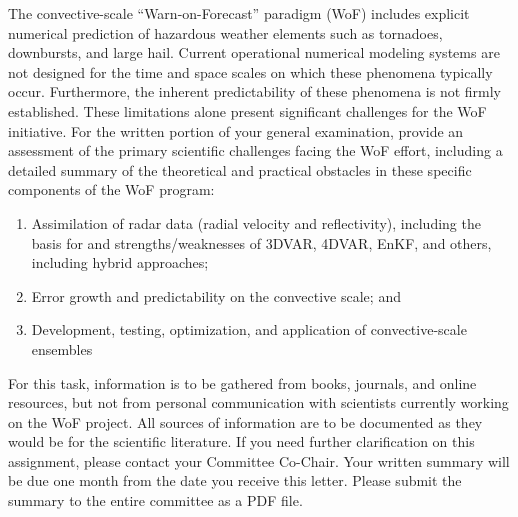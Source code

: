 


The convective-scale ``Warn-on-Forecast'' paradigm (WoF) includes explicit numerical prediction of hazardous weather elements such as tornadoes, downbursts, and large hail. Current operational numerical modeling systems are not designed for the time and space scales on which these phenomena typically occur. Furthermore, the inherent predictability of these phenomena is not firmly established. These limitations alone present significant challenges for the WoF initiative. For the written portion of your general examination, provide an assessment of the primary scientific challenges facing the WoF effort, including a detailed summary of the theoretical and practical obstacles in these specific components of the WoF program:

    \bigskip\medskip
    \begin{enumerate}
        \item Assimilation of radar data (radial velocity and reflectivity), including the basis for and strengths/weaknesses of 3DVAR, 4DVAR, EnKF, and others, including hybrid approaches;
        \item Error growth and predictability on the convective scale; and
        \item Development, testing, optimization, and application of convective-scale ensembles
    \end{enumerate}
    \medskip

For this task, information is to be gathered from books, journals, and online resources, but not from personal communication with scientists currently working on the WoF project. All sources of information are to be documented as they would be for the scientific literature. If you need further clarification on this assignment, please contact your Committee Co-Chair. Your written summary will be due one month from the date you receive this letter. Please submit the summary to the entire committee as a PDF file.


